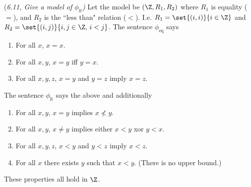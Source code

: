 \begin{problem}{(\it 6.11, Give a model of $\phi_{lt}$)}
Let the model be $(\Z,R_1,R_2)$ where $R_1$ is equality ($=$), and $R_2$ is the ``less than" relation ($<$). I.e. $R_1=\set{(i,i)}{i\in \Z}$ and $R_2=\set{(i,j)}{i,j\in \Z,\, i<j}$. The sentence $\phi_{\text{eq}}$ says
\begin{enumerate}
\item
For all $x$, $x=x$.
\item
For all $x,y$, $x=y$ iff $y=x$.
\item
For all $x,y,z$, $x=y$ and $y=z$ imply $x=z$.
\end{enumerate}
The sentence $\phi_{\text{lt}}$ says the above and additionally
\begin{enumerate}
\item
For all $x,y$, $x=y$ implies $x\not< y$.
\item 
For all $x,y$, $x\neq y$ implies either $x<y$ xor $y<x$.
\item
For all $x,y,z$, $x<y$ and $y<z$ imply $x<z$.
\item
For all $x$ there exists $y$ such that $x<y$. (There is no upper bound.) 
\end{enumerate}
These properties all hold in $\Z$.
\end{problem}

\pagebreak

